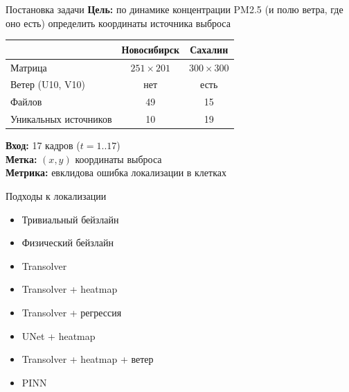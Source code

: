 \documentclass[aspectratio=169]{beamer}
\begin{document}
\begin{frame}{Постановка задачи}
  \textbf{Цель:} по динамике концентрации PM2.5 (и полю ветра, где оно есть)
  определить координаты источника выброса

  \vspace{0.4em}
  \begin{center}
    \begin{tabular}{lcc}
      \toprule
                         & \textbf{Новосибирск} & \textbf{Сахалин} \\
      \midrule
      Матрица            & $251 \times 201$ & $300 \times 300$ \\
      Ветер (U10, V10)   & нет              & есть \\
      Файлов             & 49               & 15 \\
      Уникальных источников & 10               & 19 \\
      \bottomrule
    \end{tabular}
  \end{center}

  \vspace{0.4em}
  \textbf{Вход:} 17 кадров ($t = 1..17$)\\
  \textbf{Метка:} $(x, y)$ координаты выброса\\
  \textbf{Метрика:} евклидова ошибка локализации в клетках
\end{frame}

\begin{frame}{Подходы к локализации}
  \begin{itemize}
    \item Тривиальный бейзлайн
    \item Физический бейзлайн
    \item Transolver
    \item Transolver + heatmap
    \item Transolver + регрессия
    \item UNet + heatmap
    \item Transolver + heatmap + ветер
    \item PINN
  \end{itemize}
\end{frame}
\end{document}
